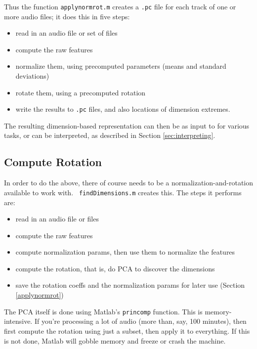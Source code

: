 \documentclass[11pt]{article}
\begin{document}
Thus the function {\tt applynormrot.m} creates a {\tt .pc} file for
each track of one or more audio files; it does this in five steps:
\begin{itemize}   \setlength{\itemsep}{0pt}\setlength{\parskip}{0pt}
\item read in an audio file or set of files
\item compute the raw  features
\item normalize them, using  precomputed parameters (means and
  standard deviations)
\item  rotate them, using a precomputed rotation
\item write the results to {\tt .pc} files, and also locations of dimension
  extremes.
\end{itemize}

The resulting dimension-based representation can then be as input to
for various tasks, or can be interpreted, as described in Section
\ref{sec:interpreting}.


\subsection{Compute Rotation} \label{computerotation}

In order to do the above, there of course needs to be a
normalization-and-rotation available to work with.  {\tt
  findDimensions.m} creates this.  The steps it performs are:
\begin{itemize}   \setlength{\itemsep}{0pt}\setlength{\parskip}{0pt}
\item read in an audio file or files
\item compute the raw  features
\item compute normalization params, then use them to normalize the features
\item compute the rotation, that is, do PCA to discover the dimensions
\item save the rotation coeffs and the normalization params for later use (Section \ref{applynormrot})
\end{itemize}

The PCA itself is done using Matlab's {\tt princomp} function.  This
is memory-intensive.  If you're processing a lot of audio (more than,
say, 100 minutes), then first compute the rotation using just a
subset, then apply it to everything.  If this is not done, Matlab
will gobble memory and freeze or crash the machine.
\end{document}
